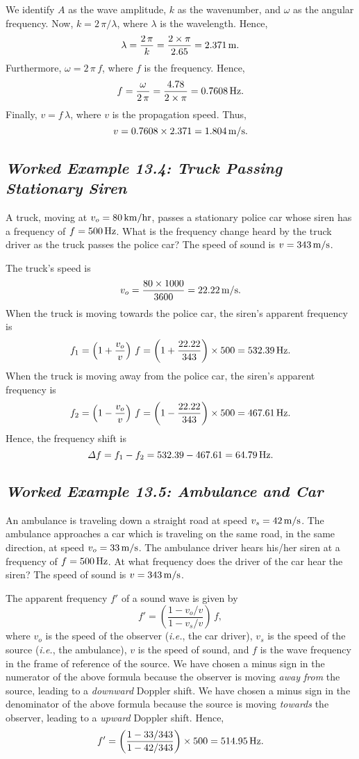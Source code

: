  We identify $A$ as the wave amplitude, $k$ as the wavenumber,
and $\omega$ as the angular frequency. Now, $k=2\,\pi/\lambda$, where $\lambda$ is
the wavelength. Hence,
$$
\lambda = \frac{2\,\pi}{k} = \frac{2\times \pi}{2.65} = 2.371\,{\rm m}.
$$
Furthermore, $\omega = 2\,\pi\,f$, where $f$ is the frequency. Hence,
$$
f = \frac{\omega}{2\,\pi} =  \frac{4.78}{2\times\pi}=0.7608\,{\rm Hz}.
$$
Finally, $v=f\,\lambda$, where $v$ is the propagation speed. Thus,
$$
v = 0.7608\times 2.371 = 1.804\,{\rm m/s}.
$$

\subsection*{\em Worked Example 13.4: Truck Passing Stationary Siren}
 A truck, moving at $v_o=80\,{\rm km/hr}$, passes a stationary
police car whose siren has a frequency of $f=500\,{\rm Hz}$.
What is the frequency change heard by the truck driver
as the truck passes the police car? The speed of sound is
$v=343\,{\rm m/s}$. 

 The truck's speed is
$$
v_o = \frac{80\times 1000}{3600} = 22.22\,{\rm m/s}.
$$
When the truck is moving towards the police car, the siren's
apparent frequency is
$$
f_1 = \left(1+\frac{v_o}{v}\right)\,f = \left(1+\frac{22.22}{343}\right)\times
500 = 532.39\,{\rm Hz}.
$$
When the truck is moving away from the police car, the siren's
apparent frequency is
$$
f_2 = \left(1-\frac{v_o}{v}\right)\,f = \left(1-\frac{22.22}{343}\right)\times
500 = 467.61\,{\rm Hz}.
$$
Hence, the frequency shift is
$$
{\mit\Delta f} = f_1-f_2 = 532.39-467.61 = 64.79\,{\rm Hz}.
$$

\subsection*{\em Worked Example 13.5: Ambulance and Car}
 An ambulance is traveling down a straight road at speed
$v_s=42\,{\rm m/s}$. The ambulance approaches a car which is traveling on the
same road, in the same direction, at speed $v_o=33\,{\rm m/s}$. The
ambulance driver hears his/her siren at a frequency of $f=500\,{\rm Hz}$. 
At what frequency does the driver of the car hear the siren? The speed  of sound is
$v=343\,{\rm m/s}$. 

The apparent frequency $f'$ of a sound wave is given by
$$
f' = \left(\frac{1-v_o/v}{1-v_s/v}\right)\,f,
$$
where $v_o$ is the speed of the observer ({\em i.e.}, the car driver), $v_s$ is
the speed of the source ({\em i.e.}, the ambulance), $v$ is the speed of sound,
and $f$ is the wave frequency in the frame of reference of the source. We
have chosen a minus sign in the numerator of the above formula because the
observer is moving {\em away from} the source, leading to a {\em downward} Doppler
shift. We
have chosen a minus sign in the denominator of the above formula because the
source is moving {\em towards}  the observer, leading to a {\em upward} Doppler
shift. Hence,
$$
f' = \left(\frac{1-33/343}{1-42/343}\right)\times 500 = 514.95\,{\rm Hz}.
$$
